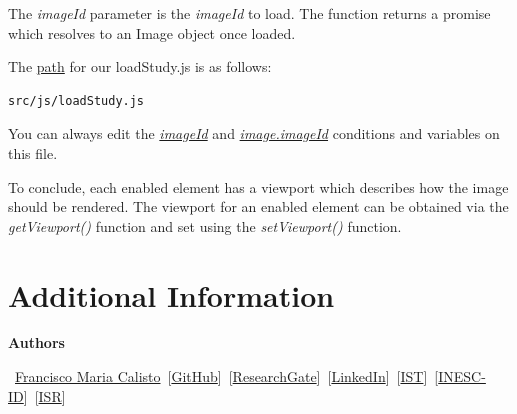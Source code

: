 \documentclass{tufte-book} %
\begin{document}
\hfill

The \textit{imageId} parameter is the \textit{imageId} to load. The function returns a promise which resolves to an Image object once loaded.

\hfill

The \href{https://github.com/MIMBCD-UI/prototype-cornerstone/blob/master/src/js/loadStudy.js}{path} for our loadStudy.js is as follows:

\hfill

\begin{lstlisting}
src/js/loadStudy.js
\end{lstlisting}

\hfill

You can always edit the \href{https://github.com/MIMBCD-UI/prototype-cornerstone/blob/master/src/js/loadStudy.js#L74}{\textit{imageId}} and \href{https://github.com/MIMBCD-UI/prototype-cornerstone/blob/master/src/js/loadStudy.js#L85}{\textit{image.imageId}} conditions and variables on this file. 

\hfill

To conclude, each enabled element has a viewport which describes how the image should be rendered. The viewport for an enabled element can be obtained via the \textit{getViewport()} function and set using the \textit{setViewport()} function.


\chapter{Additional Information}

\textbf{Authors}

\hfill

\textemdash~\href{http://franciscocalisto.me/}{Francisco Maria Calisto}~[\href{https://github.com/FMCalisto}{GitHub}]~[\href{https://www.researchgate.net/profile/Francisco_Maria_Calisto}{ResearchGate}]~[\href{https://www.linkedin.com/in/fmcalisto/}{LinkedIn}]~[\href{http://web.tecnico.ulisboa.pt/francisco.calisto/}{IST}]~[\href{http://www.inesc-id.pt/member/15650/}{INESC-ID}]~[\href{http://welcome.isr.tecnico.ulisboa.pt/author/franciscomariagalambaferraricalisto/}{ISR}]
\end{document}
